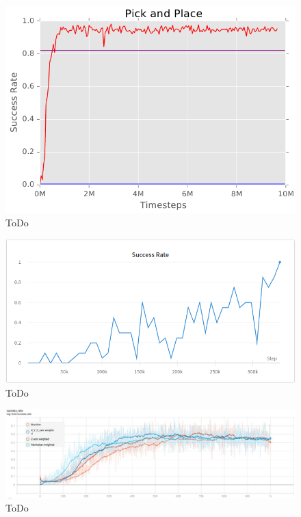 \begin{figure}[h!]
    \centering
    \includegraphics[width=\textwidth]{images/FPAPB.png}
    \caption{ToDo}
    \label{fig:HER}
\end{figure}

\begin{figure}[h!]
    \centering
    \includegraphics[width=\textwidth]{images/FPAPASR.png}
    \caption{ToDo}
    \label{fig:HER}
\end{figure}

\begin{figure}[h!]
    \centering
    \includegraphics[width=\textwidth]{images/FPAPRRE.png}
    \caption{ToDo}
    \label{fig:HER}
\end{figure}

